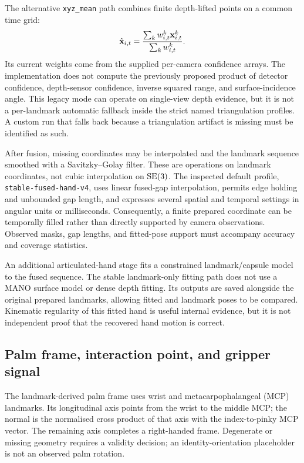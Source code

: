 The alternative \texttt{xyz\_mean} path combines finite depth-lifted points
on a common time grid:
\begin{equation}
  \hat{\mathbf{x}}_{i,t}
    =\frac{\sum_k w^k_{i,t}\mathbf{x}^k_{i,t}}{\sum_k w^k_{i,t}}.
  \label{eq:fusion}
\end{equation}
Its current weights come from the supplied per-camera confidence arrays.
The implementation does not compute the previously proposed product of
detector confidence, depth-sensor confidence, inverse squared range, and
surface-incidence angle. This legacy mode can operate on single-view depth
evidence, but it is not a per-landmark automatic fallback inside the strict
named triangulation profiles. A custom run that falls back because a
triangulation artifact is missing must be identified as such.

After fusion, missing coordinates may be interpolated and the landmark
sequence smoothed with a Savitzky--Golay filter. These are operations on
landmark coordinates, not cubic interpolation on $\mathrm{SE}(3)$. The inspected
default profile, \texttt{stable-fused-hand-v4}, uses linear fused-gap
interpolation, permits edge holding and unbounded gap length, and expresses
several spatial and temporal settings in angular units or milliseconds.
Consequently, a finite prepared coordinate can be temporally filled rather
than directly supported by camera observations. Observed masks, gap lengths,
and fitted-pose support must accompany accuracy and coverage statistics.

An additional articulated-hand stage fits a constrained landmark/capsule
model to the fused sequence. The stable landmark-only fitting path does
not use a MANO surface model or dense depth fitting. Its outputs are saved
alongside the original prepared landmarks, allowing fitted and landmark
poses to be compared. Kinematic regularity of this fitted hand is useful
internal evidence, but it is not independent proof that the recovered hand
motion is correct.

\subsection{Palm frame, interaction point, and gripper signal}

The landmark-derived palm frame uses wrist and metacarpophalangeal (MCP)
landmarks. Its longitudinal axis points from the wrist to the middle MCP;
the normal is the normalised cross product of that axis with the
index-to-pinky MCP vector. The remaining axis completes a right-handed
frame. Degenerate or missing geometry requires a validity decision; an
identity-orientation placeholder is not an observed palm rotation.

